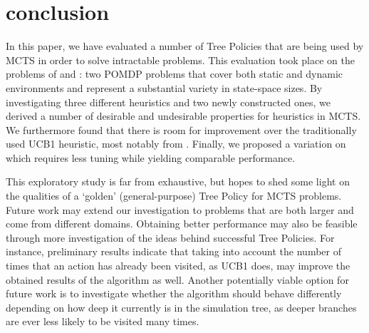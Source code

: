 \section{conclusion}
In this paper, we have evaluated a number of Tree Policies that are being used by MCTS in order to solve intractable problems. This evaluation took place on the problems of \rock and \poc: two POMDP problems that cover both static and dynamic environments and represent a substantial variety in state-space sizes. By investigating three different heuristics and two newly constructed ones, we derived a number of desirable and undesirable properties for heuristics in MCTS. We furthermore found that there is room for improvement over the traditionally used UCB1 heuristic, most notably from \soft. Finally, we proposed a variation on \soft which requires less tuning while yielding comparable performance.

This exploratory study is far from exhaustive, but hopes to shed some light on the qualities of a `golden' (general-purpose) Tree Policy for MCTS problems. Future work may extend our investigation to problems that are both larger and come from different domains. Obtaining better performance may also be feasible through more investigation of the ideas behind successful Tree Policies. For instance, preliminary results indicate that taking into account the number of times that an action has already been visited, as UCB1 does, may improve the obtained results of the \soft algorithm as well. Another potentially viable option for future work is to investigate whether the algorithm should behave differently depending on how deep it currently is in the simulation tree, as deeper branches are ever less likely to be visited many times.